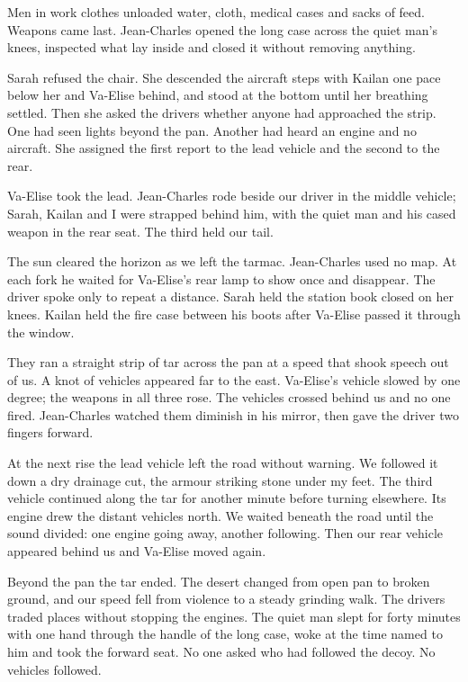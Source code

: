 Men in work clothes unloaded water, cloth, medical cases and sacks of feed. Weapons came last. Jean-Charles opened the long case across the quiet man's knees, inspected what lay inside and closed it without removing anything.\par

Sarah refused the chair. She descended the aircraft steps with Kailan one pace below her and Va-Elise behind, and stood at the bottom until her breathing settled. Then she asked the drivers whether anyone had approached the strip. One had seen lights beyond the pan. Another had heard an engine and no aircraft. She assigned the first report to the lead vehicle and the second to the rear.\par

Va-Elise took the lead. Jean-Charles rode beside our driver in the middle vehicle; Sarah, Kailan and I were strapped behind him, with the quiet man and his cased weapon in the rear seat. The third held our tail.\par

The sun cleared the horizon as we left the tarmac. Jean-Charles used no map. At each fork he waited for Va-Elise's rear lamp to show once and disappear. The driver spoke only to repeat a distance. Sarah held the station book closed on her knees. Kailan held the fire case between his boots after Va-Elise passed it through the window.\par

They ran a straight strip of tar across the pan at a speed that shook speech out of us. A knot of vehicles appeared far to the east. Va-Elise's vehicle slowed by one degree; the weapons in all three rose. The vehicles crossed behind us and no one fired. Jean-Charles watched them diminish in his mirror, then gave the driver two fingers forward.\par

At the next rise the lead vehicle left the road without warning. We followed it down a dry drainage cut, the armour striking stone under my feet. The third vehicle continued along the tar for another minute before turning elsewhere. Its engine drew the distant vehicles north. We waited beneath the road until the sound divided: one engine going away, another following. Then our rear vehicle appeared behind us and Va-Elise moved again.\par

Beyond the pan the tar ended. The desert changed from open pan to broken ground, and our speed fell from violence to a steady grinding walk. The drivers traded places without stopping the engines. The quiet man slept for forty minutes with one hand through the handle of the long case, woke at the time named to him and took the forward seat. No one asked who had followed the decoy. No vehicles followed.\par

